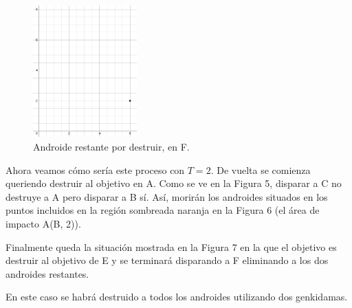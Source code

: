 \documentclass[10pt,a4paper]{article}
\begin{document}
\begin{figure}[h!]
\centering
\begin{minipage}{.5\textwidth}
  \centering
  \includegraphics[width=4cm]{EjemploArea3}
  \caption{Androide restante por destruir, en F.}
  \label{fig:test2}
\end{minipage}
\end{figure}

Ahora veamos cómo sería este proceso con $T = 2$.
De vuelta se comienza queriendo destruir al objetivo en A. Como se ve en la Figura 5, disparar a C no destruye a A pero disparar a B sí. Así, morirán los androides situados en los puntos incluidos en la región sombreada naranja en la Figura 6 (el área de impacto A(B, 2)).
\par{Finalmente queda la situación mostrada en la Figura 7 en la que el objetivo es destruir al objetivo de E y se terminará disparando a F eliminando a los dos androides restantes.}
\par{En este caso se habrá destruido a todos los androides utilizando dos genkidamas.}\\
\end{document}
